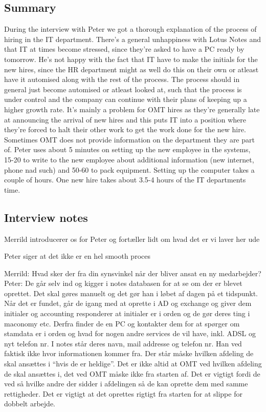 \label{app:peter}
\begin{linenumbers*}
\subsection{Summary}
During the interview with Peter we got a thorough explanation of the process of hiring in the IT department. 
There's a general unhappiness with Lotus Notes and that IT at times become stressed, since they're asked to have a PC ready by tomorrow. 
He's not happy with the fact that IT have to make the initials for the new hires, since the HR department might as well do this on their own or atleast have it automised along with the rest of the process. 
The process should in general just become automised or atleast looked at, such that the process is under control and the company can continue with their plans of keeping up a higher growth rate.
It's mainly a problem for OMT hires as they're generally late at announcing the arrival of new hires and this puts IT into a position where they're forced to halt their other work to get the work done for the new hire. Sometimes OMT does not provide information on the department they are part of.
Peter uses about 5 minutes on setting up the new employee in the systems, 15-20 to write to the new employee about additional information (new internet, phone nad such) and 50-60 to pack equipment. Setting up the computer takes a couple of hours. One new hire takes about 3.5-4 hours of the IT departments time.

\subsection{Interview notes}
Merrild introducerer os for Peter og fortæller lidt om hvad det er vi laver her ude

Peter siger at det ikke er en hel smooth proces

Merrild: Hvad sker der fra din synsvinkel når der bliver ansat en ny medarbejder?
Peter: De går selv ind og kigger i notes databasen for at se om der er blevet oprettet. Det skal gøres manuelt og det gør han i løbet af dagen på et tidspunkt.
Når det er fundet, går de igang med at oprette i AD og exchange og giver dem initialer og accounting responderer at initialer er i orden og de gør deres ting i maconomy etc.
Derfra finder de en PC og kontakter dem for at spørger om stamdata er i orden og hvad for nogen andre services de vil have, inkl. ADSL og nyt telefon nr. 
I notes står deres navn, mail addresse og telefon nr. Han ved faktisk ikke hvor informationen kommer fra. Der står måske hvilken afdeling de skal ansættes i “hvis de er heldige”.  Det er ikke altid at OMT ved hvilken afdeling de skal ansættes i, det ved OMT måske ikke fra starten af. Det er vigtigt fordi de ved så hvilke andre der sidder i afdelingen så de kan oprette dem med samme rettigheder.
Det er vigtigt at det oprettes rigtigt fra starten for at slippe for dobbelt arbejde. 


\end{linenumbers*}
